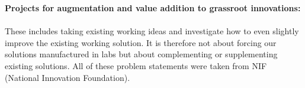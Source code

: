 
\noindent \textbf{\Large  Projects for augmentation and value addition to grassroot innovations:}\\ \\These includes taking existing working ideas and investigate how to even slightly
improve the existing working solution. It is therefore not about forcing our solutions
manufactured in labs but about complementing or supplementing existing solutions. All
of these problem statements were taken from NIF (National Innovation Foundation).\\ \\


